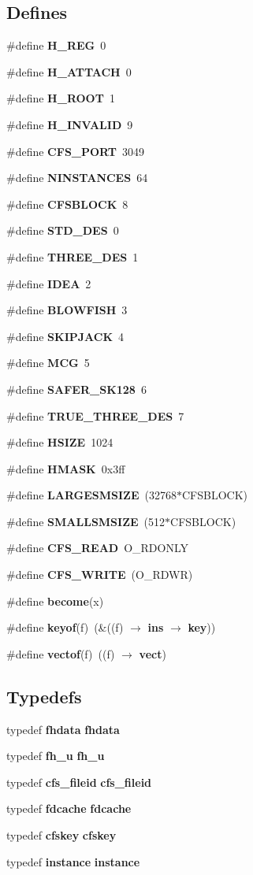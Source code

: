 \subsection*{Defines}
\begin{CompactItemize}
\item 
\#define {\bf H\_\-REG}\ 0
\item 
\#define {\bf H\_\-ATTACH}\ 0
\item 
\#define {\bf H\_\-ROOT}\ 1
\item 
\#define {\bf H\_\-INVALID}\ 9
\item 
\#define {\bf CFS\_\-PORT}\ 3049
\item 
\#define {\bf NINSTANCES}\ 64
\item 
\#define {\bf CFSBLOCK}\ 8
\item 
\#define {\bf STD\_\-DES}\ 0
\item 
\#define {\bf THREE\_\-DES}\ 1
\item 
\#define {\bf IDEA}\ 2
\item 
\#define {\bf BLOWFISH}\ 3
\item 
\#define {\bf SKIPJACK}\ 4
\item 
\#define {\bf MCG}\ 5
\item 
\#define {\bf SAFER\_\-SK128}\ 6
\item 
\#define {\bf TRUE\_\-THREE\_\-DES}\ 7
\item 
\#define {\bf HSIZE}\ 1024
\item 
\#define {\bf HMASK}\ 0x3ff
\item 
\#define {\bf LARGESMSIZE}\ (32768$\ast$CFSBLOCK)
\item 
\#define {\bf SMALLSMSIZE}\ (512$\ast$CFSBLOCK)
\item 
\#define {\bf CFS\_\-READ}\ O\_\-RDONLY
\item 
\#define {\bf CFS\_\-WRITE}\ (O\_\-RDWR)
\item 
\#define {\bf become}(x)
\item 
\#define {\bf keyof}(f)\ (\&((f) $\rightarrow$ {\bf ins} $\rightarrow$ {\bf key}))
\item 
\#define {\bf vectof}(f)\ ((f) $\rightarrow$ {\bf vect})
\end{CompactItemize}
\subsection*{Typedefs}
\begin{CompactItemize}
\item 
typedef {\bf fhdata} {\bf fhdata}
\item 
typedef {\bf fh\_\-u} {\bf fh\_\-u}
\item 
typedef {\bf cfs\_\-fileid} {\bf cfs\_\-fileid}
\item 
typedef {\bf fdcache} {\bf fdcache}
\item 
typedef {\bf cfskey} {\bf cfskey}
\item 
typedef {\bf instance} {\bf instance}
\end{CompactItemize}
